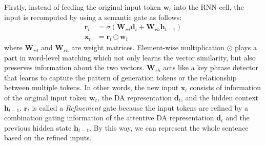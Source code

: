 \documentclass[11pt,a4paper]{article}
\begin{document}
Firstly, instead of feeding the original input token $\textbf{w}_{t}$ into the RNN cell, the input is recomputed by using a semantic gate as follows:
\begin{equation}\label{eq:d-t-1}
\begin{aligned}
	\textbf{r}_{t}&=\sigma(\textbf{W}_{rd}\textbf{d}_{t} + \textbf{W}_{rh}\textbf{h}_{t-1})\\
	\textbf{x}_{t}&=\textbf{r}_{t} \odot \textbf{w}_{t} 
\end{aligned}
\end{equation}
where $\textbf{W}_{rd}$ and $\textbf{W}_{rh}$ are weight matrices. Element-wise multiplication $\odot$ plays a part in word-level matching which not only learns the vector similarity, but also preserves information about the two vectors. $\textbf{W}_{rh}$ acts like a key phrase detector that learns to capture the pattern of generation tokens or the relationship between multiple tokens. In other words, the new input $\textbf{x}_{t}$ consists of information of the original input token $\textbf{w}_{t}$, the DA representation $\textbf{d}_{t}$, and the hidden context $\textbf{h}_{t-1}$. $\textbf{r}_{t}$ is called a \textit{Refinement} gate because the input tokens are refined by a combination gating information of the attentive DA representation $\textbf{d}_{t}$ and the previous hidden state $\textbf{h}_{t-1}$. By this way, we can represent the whole sentence based on the refined inputs.
\end{document}
